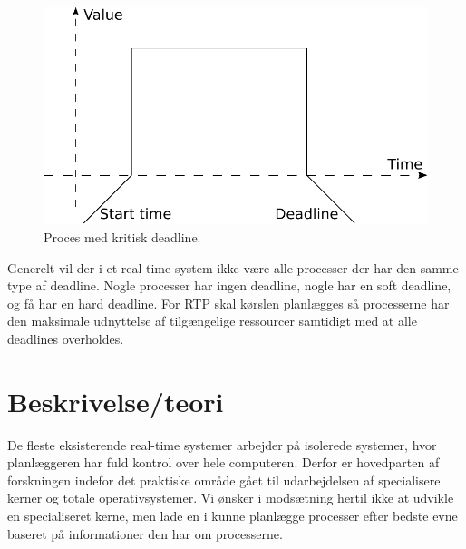 \begin{figure}
 \begin{center}
  \includegraphics[scale=0.75]{images/critical-deadline}
	\caption{Proces med kritisk deadline.}
	\label{fig:hard-rtp}
\end{center}
\end{figure}

Generelt vil der i et real-time system ikke være alle processer der har den samme type af deadline. Nogle processer har ingen deadline, nogle har en soft deadline, og få har en hard deadline. For RTP skal kørslen planlægges så processerne har den maksimale udnyttelse af tilgængelige ressourcer samtidigt med at alle deadlines overholdes.

\section{Beskrivelse/teori}
De fleste eksisterende real-time systemer arbejder på isolerede systemer, hvor planlæggeren har fuld kontrol over hele computeren. Derfor er hovedparten af forskningen indefor det praktiske område gået til udarbejdelsen af specialisere kerner og totale operativsystemer\cite{damm1989real, jones1979staros, levi1989maruti,ramamritham14scheduling}. Vi ønsker i modsætning hertil ikke at udvikle en specialiseret kerne, men lade \sched en i \pycsp kunne planlægge processer efter bedste evne baseret på informationer den har om processerne.

